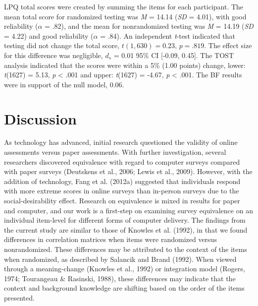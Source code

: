 \documentclass[english,man]{apa6}
\theoremstyle{definition}
\theoremstyle{definition}
\theoremstyle{definition}
\theoremstyle{remark}
\begin{document}
LPQ total scores were created by summing the items for each participant.
The mean total score for randomized testing was \emph{M} = 14.14
(\emph{SD} = 4.01), with good reliability (\(\alpha\) = .82), and the
mean for nonrandomized testing was \emph{M} = 14.19 (\emph{SD} = 4.22)
and good reliability (\(\alpha\) = .84). An independent \emph{t}-test
indicated that testing did not change the total score,
\(t(1,630) = 0.23\), \(p = .819\). The effect size for this difference
was negligible, \(d_{s}\) = 0.01 95\% CI {[}-0.09, 0.45{]}. The TOST
analysis indicated that the scores were within a 5\% (1.00 points)
change, lower: \emph{t}(1627) = 5.13, \emph{p} \textless{} .001 and
upper: \emph{t}(1627) = -4.67, \emph{p} \textless{} .001. The BF results
were in support of the null model, 0.06.

\section{Discussion}\label{discussion}

As technology has advanced, initial research questioned the validity of
online assessments versus paper assessments. With further investigation,
several researchers discovered equivalence with regard to computer
surveys compared with paper surveys (Deutskens et al., 2006; Lewis et
al., 2009). However, with the addition of technology, Fang et al.
(2012a) suggested that individuals respond with more extreme scores in
online surveys than in-person surveys due to the social-desirability
effect. Research on equivalence is mixed in results for paper and
computer, and our work is a first-step on examining survey equivalence
on an individual item-level for different forms of computer delivery.
The findings from the current study are similar to those of Knowles et
al. (1992), in that we found differences in correlation matrices when
items were randomized versus nonrandomized. These differences may be
attributed to the context of the items when randomized, as described by
Salancik and Brand (1992). When viewed through a meaning-change (Knowles
et al., 1992) or integration model (Rogers, 1974; Tourangeau \&
Rasinski, 1988), these differences may indicate that the context and
background knowledge are shifting based on the order of the items
presented.
\end{document}
